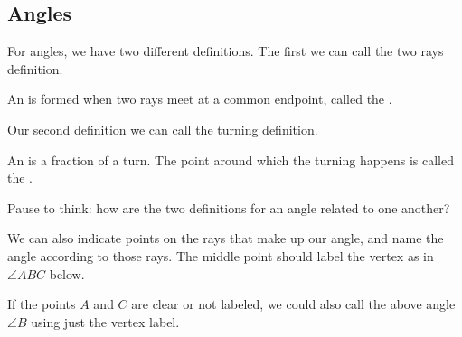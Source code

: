 \documentclass{ximera}
\begin{document}
\subsection{Angles}

For angles, we have two different definitions. The first we can call the two rays definition.

\begin{definition}
An   is formed when two rays meet at a common endpoint, called the .
\end{definition}

Our second definition we can call the turning definition.

\begin{definition}
An   is a fraction of a turn. The point around which the turning happens is called the .
\end{definition}

\begin{center}
\end{center}

\begin{question}
Pause to think: how are the two definitions for an angle related to one another?
\begin{freeResponse} \end{freeResponse}
\end{question}

We can also indicate points on the rays that make up our angle, and name the angle according to those rays. The middle point should label the vertex as in $\angle ABC$ below.
\begin{center}
\end{center}
If the points $A$ and $C$ are clear or not labeled, we could also call the above angle $\angle B$ using just the vertex label.
\end{document}
